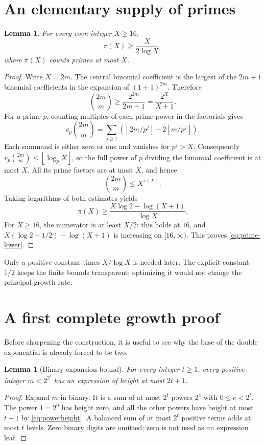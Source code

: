\documentclass[11pt,a4paper]{article}
\newtheorem{lemma}[theorem]{Lemma}
\theoremstyle{definition}
\theoremstyle{remark}
\newcommand{\floor}[1]{\left\lfloor #1\right\rfloor}
\begin{document}
\section{An elementary supply of primes}\label{sec:primes}
\begin{lemma}\label{lem:chebyshev}
For every even integer $X\ge16$,
\begin{equation}\label{eq:prime-lower}
 \pi(X)\ge\frac{X}{2\log X},
\end{equation}
where $\pi(X)$ counts primes at most $X$.
\end{lemma}
\begin{proof}
Write $X=2m$. The central binomial coefficient is the largest of the
$2m+1$ binomial coefficients in the expansion of $(1+1)^{2m}$. Therefore
\[
 \binom{2m}{m}\ge\frac{2^{2m}}{2m+1}=\frac{2^X}{X+1}.
\]
For a prime $p$, counting multiples of each prime power in the factorials
gives
\[
 v_p\binom{2m}{m}
 =\sum_{j\ge1}\left(\floor{2m/p^j}-2\floor{m/p^j}\right).
\]
Each summand is either zero or one and vanishes for $p^j>X$.
Consequently $v_p\binom{2m}{m}\le\floor{\log_p X}$, so the full power of
$p$ dividing the binomial coefficient is at most $X$. All its prime
factors are at most $X$, and hence
\[
 \binom{2m}{m}\le X^{\pi(X)}.
\]
Taking logarithms of both estimates yields
\[
 \pi(X)\ge\frac{X\log2-\log(X+1)}{\log X}.
\]
For $X\ge16$, the numerator is at least $X/2$: this holds at $16$, and
$X(\log2-1/2)-\log(X+1)$ is increasing on $[16,\infty)$.
This proves \eqref{eq:prime-lower}.
\end{proof}

Only a positive constant times $X/\log X$ is needed later. The explicit
constant $1/2$ keeps the finite bounds transparent; optimizing it would
not change the principal growth rate.

\section{A first complete growth proof}\label{sec:first-growth}
Before sharpening the construction, it is useful to see why the base of
the double exponential is already forced to be two.

\begin{lemma}[Binary expansion bound]\label{lem:binary}
For every integer $t\ge1$, every positive integer $m<2^{2^t}$ has an
expression of height at most $2t+1$.
\end{lemma}
\begin{proof}
Expand $m$ in binary. It is a sum of at most $2^t$ powers $2^e$ with
$0\le e<2^t$. The power $1=2^0$ has height zero, and all the other powers
have height at most $t+1$ by \eqref{eq:powerheight}.
A balanced sum of at most $2^t$ positive terms adds at most $t$ levels.
Zero binary digits are omitted; zero is not used as an expression leaf.
\end{proof}
\end{document}

